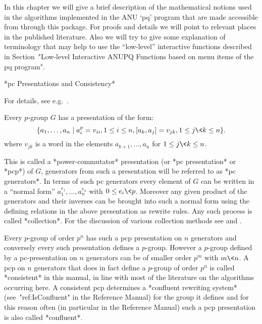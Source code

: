 

In this chapter  we will give a brief  description of the mathematical
notions used in the algorithms  implemented in the ANU `pq' program
that are made accessible from {\GAP} through this package.  For proofs
and  details  we  will  point  to relevant  places  in  the  published
literature.  Also we will try  to give some explanation of terminology
that may help to use the ``low-level'' interactive functions described
in Section~"Low-level Interactive ANUPQ  Functions based on menu items
of the pq program".


*pc Presentations and Consistency*

For details, see  e.g.~\cite{NNN98}.

Every $p$-group $G$ has a presentation of the form: 
$$
\{a_1,\dots,a_n \mid a_i^p = v_{ii}, 1 \le i \le n, 
               [a_k, a_j] = v_{jk}, 1 \le j \< k \le n \}.  
$$
where $v_{jk}$ is a word in the elements $a_{k+1},\dots,a_n$ for 
$1 \le j \< k \le n$.

This is called a *power-commutator* presentation (or *pc presentation*
or *pcp*) of $G$, generators from such a presentation will be referred
to as *pc generators*. In terms of such pc generators every element of
$G$ can be written in a  ``normal  form''  $a_1^{e_1},\dots,a_n^{e_n}$
with $0 \le e_i \< p$. Moreover any given product  of  the  generators
and their inverses can be brought into such a normal  form  using  the
defining relations in the above presentation  as  rewrite  rules.  Any
such process is called *collection*. For  the  discussion  of  various
collection methods see \cite{LGS90} and 
\cite{VL90a}. %

Every $p$-group of order $p^n$ has such  a  pcp  presentation  on  $n$
generators and conversely every such presentation defines a $p$-group.
However a $p$-group defined by a pc-presentation on $n$ generators can
be of smaller order $p^m$ with $m\<n$. A pcp on  $n$  generators  that
does in fact define a $p$-group of order $p^n$ is called  *consistent*
in this manual, in line with most of the literature on the  algorithms
occurring here. A consistent pcp  determines  a  *confluent  rewriting
system* (see~"ref:IsConfluent" in the {\GAP} Reference Manual) for the
group it defines and for this  reason  often  (in  particular  in  the
{\GAP} Reference Manual)  such  a  pcp  presentation  is  also  called
*confluent*.

